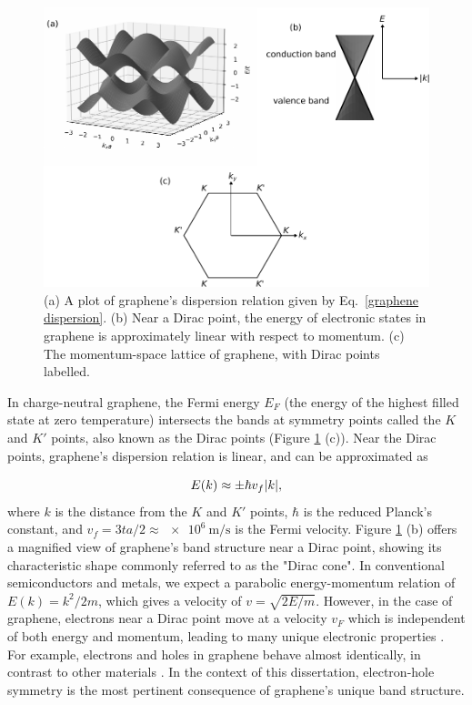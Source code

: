 \documentclass[double,12pt,1in,seploa]{beavtex}
\begin{document}
\begin{figure}
    \includegraphics[width = 1\textwidth]{Graphene band structure 3D.pdf}
    \caption{(a) A plot of graphene's dispersion relation given by Eq.\ \ref{graphene dispersion}. (b) Near a Dirac point, the energy of electronic states in graphene is approximately linear with respect to momentum. (c) The momentum-space lattice of graphene, with Dirac points labelled.}
    \label{graphene dispersion plot}
\end{figure}
In charge-neutral graphene, the Fermi energy $E_F$ (the energy of the highest filled state at zero temperature) intersects the bands at symmetry points called the $K$ and $K'$ points, also known as the Dirac points (Figure \ref{graphene dispersion plot} (c)). Near the Dirac points, graphene's dispersion relation is linear, and can be approximated as


\begin{equation}
    E(k) \approx \pm \hbar v_f \abs{k}, \label{linear dispersion of graphene}
\end{equation}
where $k$ is the distance from the $K$ and $K'$ points, $\hbar$ is the reduced Planck's constant, and $v_f = 3ta/2 \approx \SI{e6}{\meter/\second}$ is the Fermi velocity. Figure \ref{graphene dispersion plot} (b) offers a magnified view of graphene's band structure near a Dirac point, showing its characteristic shape commonly referred to as the "Dirac cone". In conventional semiconductors and metals, we expect a parabolic energy-momentum relation of $E(k) = k^2/2m$, which gives a velocity of $v = \sqrt{2E/m}$. However, in the case of graphene, electrons near a Dirac point move at a velocity $v_F$ which is independent of both energy and momentum, leading to many unique electronic properties \cite{castro_neto_electronic_2009}. For example, electrons and holes in graphene behave almost identically, in contrast to other materials \cite{novoselov_electronic_2007,castro_neto_electronic_2009}. In the context of this dissertation, electron-hole symmetry is the most pertinent consequence of graphene’s unique band structure.
\end{document}
